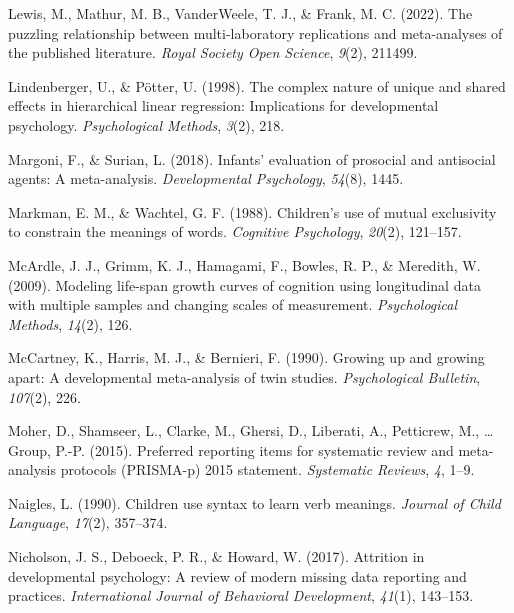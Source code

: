 \documentclass[
  man]{apa6}
\newlength{\cslhangindent}
\newlength{\cslentryspacingunit} %
\newenvironment{CSLReferences}[2] %
 {%
  \setlength{\parindent}{0pt}
  \ifodd #1
  \let\oldpar\par
  \def\par{\hangindent=\cslhangindent\oldpar}
  \fi
  \setlength{\parskip}{#2\cslentryspacingunit}
 }%
 {}
\begin{document}
\begin{CSLReferences}{1}{0}
\leavevmode{}%
Lewis, M., Mathur, M. B., VanderWeele, T. J., \& Frank, M. C. (2022). The puzzling relationship between multi-laboratory replications and meta-analyses of the published literature. \emph{Royal Society Open Science}, \emph{9}(2), 211499.

\leavevmode{}%
Lindenberger, U., \& Pötter, U. (1998). The complex nature of unique and shared effects in hierarchical linear regression: Implications for developmental psychology. \emph{Psychological Methods}, \emph{3}(2), 218.

\leavevmode{}%
Margoni, F., \& Surian, L. (2018). Infants' evaluation of prosocial and antisocial agents: A meta-analysis. \emph{Developmental Psychology}, \emph{54}(8), 1445.

\leavevmode{}%
Markman, E. M., \& Wachtel, G. F. (1988). Children's use of mutual exclusivity to constrain the meanings of words. \emph{Cognitive Psychology}, \emph{20}(2), 121--157.

\leavevmode{}%
McArdle, J. J., Grimm, K. J., Hamagami, F., Bowles, R. P., \& Meredith, W. (2009). Modeling life-span growth curves of cognition using longitudinal data with multiple samples and changing scales of measurement. \emph{Psychological Methods}, \emph{14}(2), 126.

\leavevmode{}%
McCartney, K., Harris, M. J., \& Bernieri, F. (1990). Growing up and growing apart: A developmental meta-analysis of twin studies. \emph{Psychological Bulletin}, \emph{107}(2), 226.

\leavevmode{}%
Moher, D., Shamseer, L., Clarke, M., Ghersi, D., Liberati, A., Petticrew, M., \ldots{} Group, P.-P. (2015). Preferred reporting items for systematic review and meta-analysis protocols (PRISMA-p) 2015 statement. \emph{Systematic Reviews}, \emph{4}, 1--9.

\leavevmode{}%
Naigles, L. (1990). Children use syntax to learn verb meanings. \emph{Journal of Child Language}, \emph{17}(2), 357--374.

\leavevmode{}%
Nicholson, J. S., Deboeck, P. R., \& Howard, W. (2017). Attrition in developmental psychology: A review of modern missing data reporting and practices. \emph{International Journal of Behavioral Development}, \emph{41}(1), 143--153.


\end{CSLReferences}
\end{document}

